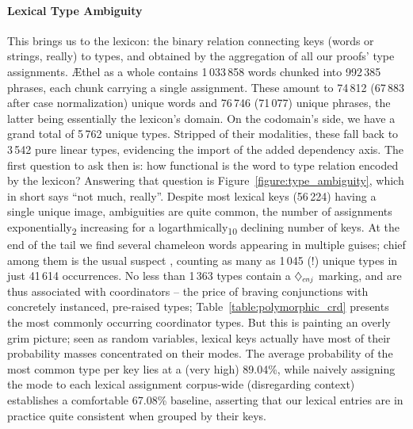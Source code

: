 \paragraph{Lexical Type Ambiguity}
This brings us to the lexicon: the binary relation connecting keys (words or strings, really) to types, and obtained by the aggregation of all our proofs' type assignments.
\AE thel as a whole contains 1\,033\,858 words chunked into 992\,385 phrases, each chunk carrying a single assignment.
These amount to  74\,812 (67\,883 after case normalization) unique words and 76\,746 (71\,077) unique phrases, the latter being essentially the lexicon's domain.
On the codomain's side, we have a grand total of 5\,762 unique \NLPplus{} types.
Stripped of their modalities, these fall back to 3\,542 pure linear types, evidencing the import of the added dependency axis.
The first question to ask then is: how functional is the word to type relation encoded by the lexicon?
Answering that question is Figure~\ref{figure:type_ambiguity}, which in short says ``not much, really''.
Despite most lexical keys (56\,224) having a single unique image, ambiguities are quite common, the number of assignments exponentially\textsubscript{2} increasing for a logarthmically\textsubscript{10} declining number of keys.
At the end of the tail we find several chameleon words appearing in multiple guises; chief among them is the usual suspect , counting as many as 1\,045 (!) unique types in just 41\,614 occurrences.
No less than 1\,363 types contain a $\ddia{cnj}$ marking, and are thus associated with coordinators -- the price of braving conjunctions with concretely instanced, pre-raised types; Table~\ref{table:polymorphic_crd} presents the most commonly occurring coordinator types.
But this is painting an overly grim picture; seen as random variables, lexical keys actually have most of their probability masses concentrated on their modes.
The average probability of the most common type per key lies at a (very high) 89.04\%, while naively assigning the mode to each lexical assignment corpus-wide (disregarding context) establishes a comfortable 67.08\% baseline, asserting that our lexical entries are in practice quite consistent when grouped by their keys.


